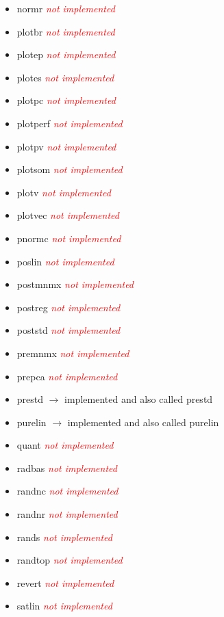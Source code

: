 \begin{itemize}
	\item normr \textcolor{red}{\textit{not implemented}}
	\item plotbr \textcolor{red}{\textit{not implemented}}
	\item plotep \textcolor{red}{\textit{not implemented}}
	\item plotes \textcolor{red}{\textit{not implemented}}
	\item plotpc \textcolor{red}{\textit{not implemented}}
	\item plotperf \textcolor{red}{\textit{not implemented}}
	\item plotpv \textcolor{red}{\textit{not implemented}}
	\item plotsom \textcolor{red}{\textit{not implemented}}
	\item plotv \textcolor{red}{\textit{not implemented}}
	\item plotvec \textcolor{red}{\textit{not implemented}}
	\item pnormc \textcolor{red}{\textit{not implemented}}
	\item poslin \textcolor{red}{\textit{not implemented}}
	\item postmnmx \textcolor{red}{\textit{not implemented}}
	\item postreg \textcolor{red}{\textit{not implemented}}
	\item poststd \textcolor{red}{\textit{not implemented}}
	\item premnmx \textcolor{red}{\textit{not implemented}}
	\item prepca \textcolor{red}{\textit{not implemented}}
	\item prestd $\rightarrow$ implemented and also called prestd
	\item purelin $\rightarrow$ implemented and also called purelin
	\item quant \textcolor{red}{\textit{not implemented}}
	\item radbas \textcolor{red}{\textit{not implemented}}
	\item randnc \textcolor{red}{\textit{not implemented}}
	\item randnr \textcolor{red}{\textit{not implemented}}
	\item rands \textcolor{red}{\textit{not implemented}}
	\item randtop \textcolor{red}{\textit{not implemented}}
	\item revert \textcolor{red}{\textit{not implemented}}
	\item satlin \textcolor{red}{\textit{not implemented}}

\end{itemize}
